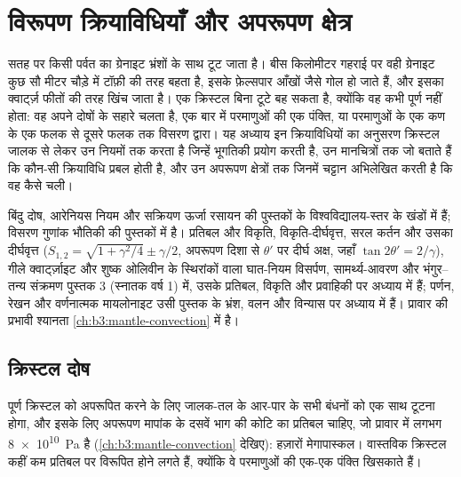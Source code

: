 \chapter{विरूपण क्रियाविधियाँ और अपरूपण क्षेत्र}\label{ch:b3:deformation-mechanisms}

सतह पर किसी पर्वत का ग्रेनाइट भ्रंशों के साथ टूट जाता है। बीस
किलोमीटर गहराई पर वही ग्रेनाइट कुछ सौ मीटर चौड़े  में टॉफ़ी की तरह बहता है,
इसके फ़ेल्सपार आँखों जैसे गोल हो जाते हैं, और इसका क्वार्ट्ज़ फीतों की तरह खिंच जाता है।
एक क्रिस्टल बिना टूटे बह सकता है, क्योंकि वह कभी पूर्ण नहीं होता:
वह अपने दोषों के सहारे चलता है, एक बार में परमाणुओं की एक पंक्ति, या परमाणुओं के
एक कण के एक फलक से दूसरे फलक तक विसरण द्वारा। यह अध्याय इन क्रियाविधियों का अनुसरण
क्रिस्टल जालक से लेकर उन नियमों तक करता है जिन्हें भूगतिकी प्रयोग करती है, उन मानचित्रों तक जो बताते हैं कि
कौन-सी क्रियाविधि प्रबल होती है, और उन अपरूपण क्षेत्रों तक जिनमें चट्टान अभिलेखित करती है कि वह कैसे चली।

\begin{recall}
बिंदु दोष, आरेनियस नियम और सक्रियण ऊर्जा रसायन की पुस्तकों के विश्वविद्यालय-स्तर के
खंडों में हैं; विसरण गुणांक भौतिकी की
पुस्तकों में है। प्रतिबल और विकृति, विकृति-दीर्घवृत्त, सरल कर्तन और उसका दीर्घवृत्त
($S_{1,2} = \sqrt{1 + \gamma^2/4} \pm \gamma/2$, अपरूपण दिशा से $\theta'$ पर दीर्घ अक्ष,
जहाँ $\tan2\theta' = 2/\gamma$), गीले क्वार्ट्ज़ाइट और शुष्क ओलिवीन के स्थिरांकों वाला घात-नियम विसर्पण,
सामर्थ्य-आवरण और भंगुर–तन्य संक्रमण पुस्तक 3 (स्नातक वर्ष 1) में, उसके
प्रतिबल, विकृति और प्रवाहिकी पर अध्याय में हैं; पर्णन, रेखन और वर्णनात्मक
मायलोनाइट उसी पुस्तक के भ्रंश, वलन और विन्यास पर अध्याय में हैं।
प्रावार की प्रभावी
श्यानता \cref{ch:b3:mantle-convection} में है।
\end{recall}

\section{क्रिस्टल दोष}

पूर्ण क्रिस्टल को अपरूपित करने के लिए जालक-तल के आर-पार के सभी बंधनों को एक साथ
टूटना होगा, और इसके लिए अपरूपण मापांक के दसवें भाग की कोटि का प्रतिबल चाहिए,
जो प्रावार में लगभग \qty{8e10}{Pa} है
(\cref{ch:b3:mantle-convection} देखिए): हज़ारों मेगापास्कल।
वास्तविक क्रिस्टल कहीं कम प्रतिबल पर विरूपित होने लगते हैं, क्योंकि वे परमाणुओं की एक-एक पंक्ति खिसकाते हैं।

